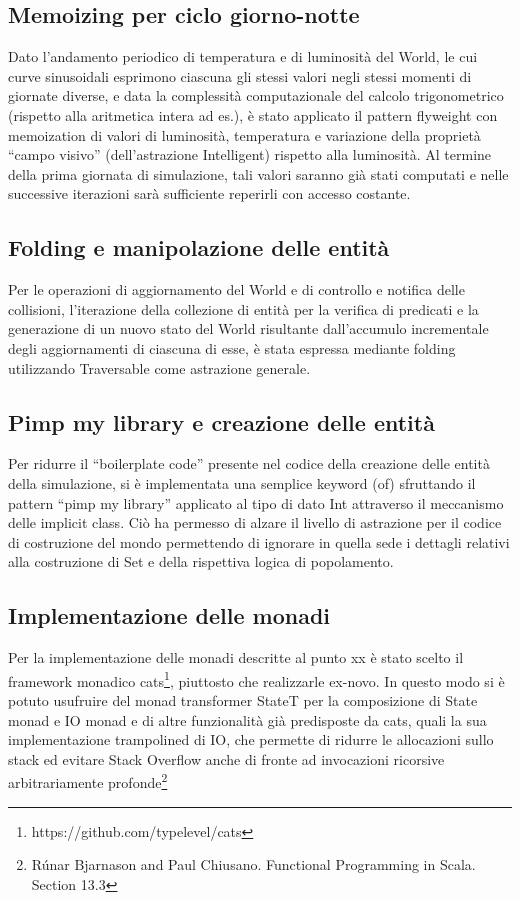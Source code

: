 \subsection{Memoizing per ciclo giorno-notte}
Dato l’andamento periodico di temperatura e di luminosità del World, le cui curve sinusoidali esprimono ciascuna gli stessi valori negli stessi momenti di giornate diverse, e data la complessità computazionale del calcolo trigonometrico (rispetto alla aritmetica intera ad es.), è stato applicato il pattern flyweight con memoization di valori di luminosità, temperatura e variazione della proprietà “campo visivo” (dell’astrazione Intelligent) rispetto alla luminosità. Al termine della prima giornata di simulazione, tali valori saranno già stati computati e nelle successive iterazioni sarà sufficiente reperirli con accesso costante.

\subsection{Folding e manipolazione delle entità}
Per le operazioni di aggiornamento del World e di controllo e notifica delle collisioni, l’iterazione della collezione di entità per la verifica di predicati e la generazione di un nuovo stato del World risultante dall’accumulo incrementale degli aggiornamenti di ciascuna di esse, è stata espressa mediante folding utilizzando Traversable come astrazione generale.

\subsection{Pimp my library e creazione delle entità}
Per ridurre il “boilerplate code” presente nel codice della creazione delle entità della simulazione, si è implementata una semplice keyword (of) sfruttando il pattern “pimp my library” applicato al tipo di dato Int attraverso il meccanismo delle implicit class. Ciò ha permesso di alzare il livello di astrazione per il codice di costruzione del mondo permettendo di ignorare in quella sede i dettagli relativi alla costruzione di Set e della rispettiva logica di popolamento.

\subsection{Implementazione delle monadi}
Per la implementazione delle monadi descritte al punto xx è stato scelto il framework monadico cats\footnote{https://github.com/typelevel/cats}, piuttosto che realizzarle ex-novo. In questo modo si è potuto usufruire del monad transformer StateT per la composizione di State monad e IO monad e di altre funzionalità già predisposte da cats, quali la sua implementazione trampolined di IO, che permette di ridurre le allocazioni sullo stack ed evitare Stack Overflow anche di fronte ad invocazioni ricorsive arbitrariamente profonde\footnote{Rúnar Bjarnason and Paul Chiusano. Functional Programming in Scala. Section 13.3}


